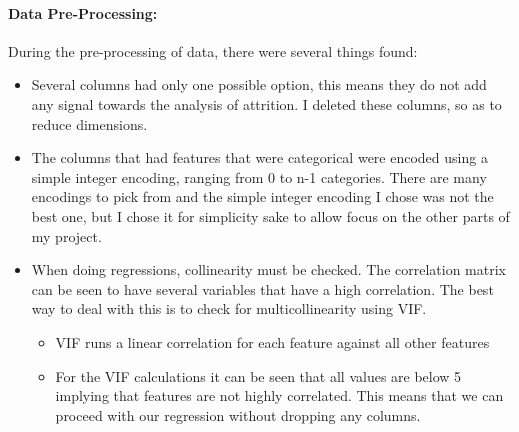 \documentclass{article}
\begin{document}
\paragraph{Data Pre-Processing:} During the pre-processing of data, there were several things found:
\vspace{-2mm} 
\begin{itemize}[leftmargin=0.5cm]
\item Several columns had only one possible option, this means they do not add any signal towards the analysis of attrition. I deleted these columns, so as to reduce dimensions.
\item The columns that had features that were categorical were encoded using a simple integer encoding, ranging from 0 to n-1 categories. There are many encodings to pick from and the simple integer encoding I chose was not the best one, but I chose it for simplicity sake to allow focus on the other parts of my project. 
\item When doing regressions, collinearity must be checked. The correlation matrix can be seen to have several variables that have a high correlation. The best way to deal with this is to check for multicollinearity using VIF. \cite{VIF1} \cite{VIF2}
\begin{itemize}
\item VIF runs a linear correlation for each feature against all other features
\item For the VIF calculations it can be seen that all values are below 5 implying that  features are not highly correlated. This means that we can proceed with our regression without dropping any columns.
\end{itemize}
\end{itemize}
\end{document}
